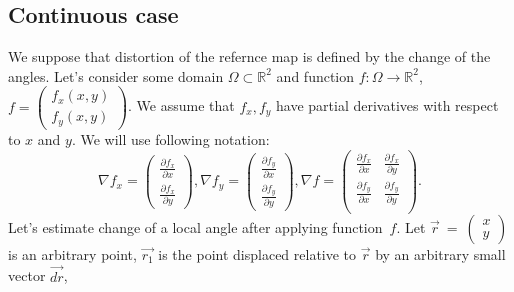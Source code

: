 \documentclass{article}
\newcommand{\vect}{\overrightarrow}
\begin{document}
\subsection{Continuous case}
\label{sec:continuous}
We suppose that distortion of the refernce map is defined by the change of the angles. 
Let's consider some domain $\Omega \subset \mathbb{R}^2$ and function $f: \Omega \to \mathbb{R}^2$, 
$f = \begin{pmatrix} f_x(x, y) \\ f_y(x, y) \end{pmatrix}$. We assume that $f_x, f_y$ have partial derivatives with respect to $x$ and $y$. 
We will use following notation:
$$
  \nabla f_x = \begin{pmatrix} \frac{\partial f_x}{\partial x} \\ \frac{\partial f_x}{\partial y} \end{pmatrix}, 
  \nabla f_y = \begin{pmatrix} \frac{\partial f_y}{\partial x} \\ \frac{\partial f_y}{\partial y} \end{pmatrix}, 
  \nabla f = \begin{pmatrix} 
    \frac{\partial f_x}{\partial x} & \frac{\partial f_x}{\partial y} \\
    \frac{\partial f_y}{\partial x} & \frac{\partial f_y}{\partial y} \\
  \end{pmatrix}. 
$$
Let's estimate change of a local angle after applying function~$f$. Let $\vect{r}~=~\begin{pmatrix} x \\ y \end{pmatrix}$ is an arbitrary point, 
$\vect{r_1}$ is the point displaced relative to $\vect{r}$ by an arbitrary small vector $\vect{dr}$, 
\end{document}
